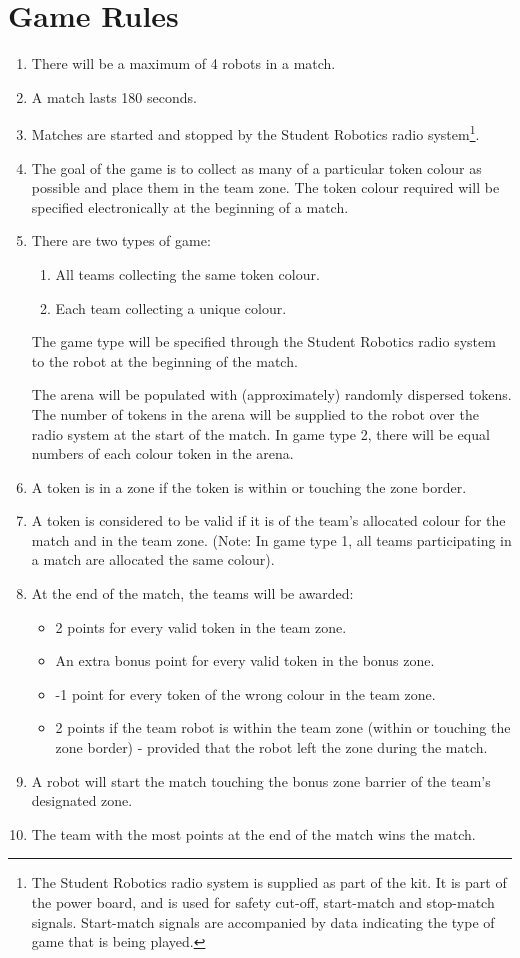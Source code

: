 \section {Game Rules}
\label{game-rules}

\begin{enumerate}
\item There will be a maximum of 4 robots in a match.
\item A match lasts 180 seconds.
\item Matches are started and stopped by the Student Robotics radio system\footnote{The Student Robotics radio system is supplied as part of the kit.  It is part of the power board, and is used for safety cut-off, start-match and stop-match signals.  Start-match signals are accompanied by data indicating the type of game that is being played.}.
\item The goal of the game is to collect as many of a particular token colour as possible and place them in the team zone.  The token colour required will be specified electronically at the beginning of a match.
\item There are two types of game:
  \renewcommand{\labelenumii}{\arabic{enumii}.}
  \begin{enumerate}
  \item All teams collecting the same token colour.
  \item Each team collecting a unique colour. 
  \end{enumerate}
The game type will be specified through the Student Robotics radio system to the robot at the beginning of the match.

The arena will be populated with (approximately) randomly dispersed tokens.  The number of tokens in the arena will be supplied to the robot over the radio system at the start of the match.  In game type 2, there will be equal numbers of each colour token in the arena.

\item A token is in a zone if the token is within or touching the zone border.
\item A token is considered to be valid if it is of the team's allocated colour for the match and in the team zone.  (Note: In game type 1, all teams participating in a match are allocated the same colour).
\item At the end of the match, the teams will be awarded:
  \begin{itemize}
  \item 2 points for every valid token in the team zone.
  \item An extra bonus point for every valid token in the bonus zone.
  \item -1 point for every token of the wrong colour in the team zone.
  \item 2 points if the team robot is within the team zone (within or touching the zone border) - provided that the robot left the zone during the match.
  \end{itemize}
\item A robot will start the match touching the bonus zone barrier of the team's designated zone.
\item The team with the most points at the end of the match wins the match.
\end{enumerate}
